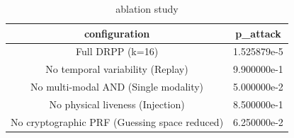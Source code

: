 \begin{table}[h]
\centering
\begin{tabular}{|c|c|}
\hline
configuration & p_attack \\ \hline
Full DRPP (k=16) & 1.525879e-5 \\
No temporal variability (Replay) & 9.900000e-1 \\
No multi-modal AND (Single modality) & 5.000000e-2 \\
No physical liveness (Injection) & 8.500000e-1 \\
No cryptographic PRF (Guessing space reduced) & 6.250000e-2 \\
\hline
\end{tabular}
\caption{ablation study}
\label{tab:T10}
\end{table}
